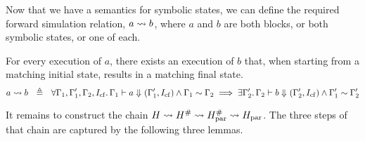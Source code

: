 {Now that we have a semantics for symbolic states, we can define the required forward simulation relation, $a \mathrel{\leadsto} b$, where $a$ and $b$ are both blocks, or both symbolic states, or one of each.


\begin{definition}
  For every execution of $a$, there exists an execution of $b$ that,
  when starting from a matching initial state, results in a matching final state.
  \begin{equation*}
      a \curly b\ \ \defeq\ \ \forall\context_1, \context_1',
        \context_2, \cfinstr\ldotp
        \sem{}{\context_1}{a}{(\context_1', \cfinstr)} \land
        \context_1 \sim \context_2 \implies
      \exists\context_2'\ldotp \sem{}{\context_2}{b}{(\context_2', \cfinstr)}
 \land \context_1' \sim \context_2'\\
  \end{equation*}
\end{definition}

It remains to construct the chain $H \mathrel{\leadsto} H^{\#} \mathrel{\leadsto} H_\text{par}^{\#} \mathrel{\leadsto} H_\text{par}$. The three steps of that chain are captured by the following three lemmas.

}
